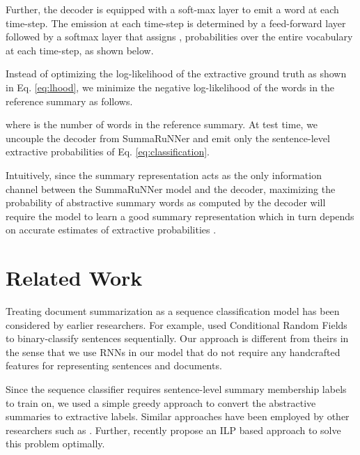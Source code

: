 \documentclass[letterpaper]{article}
\begin{document}
Further, the decoder is equipped with a soft-max layer to emit a word at each time-step. The emission at each time-step is determined by a feed-forward layer  followed by a softmax layer that assigns , probabilities over the entire vocabulary at each time-step, as shown below.

Instead of optimizing the log-likelihood of the extractive ground truth as shown in Eq. \ref{eq:lhood}, we minimize the negative log-likelihood of the words in the reference summary as follows.

where  is the number of words in the reference summary. At test time, we uncouple the decoder from SummaRuNNer and emit only the sentence-level extractive probabilities  of Eq. \ref{eq:classification}. 

Intuitively, since the summary representation  acts as the only information channel between the SummaRuNNer model and the decoder, maximizing the probability of abstractive summary words as computed by the decoder will require the model to learn a good summary representation which in turn depends on accurate estimates of extractive probabilities . 

\section{Related Work}

Treating document summarization as a sequence classification model has been considered by earlier researchers. For example, \cite{crf4summarization} used Conditional Random Fields to binary-classify sentences sequentially. Our approach is different from theirs in the sense that we use RNNs in our model that do not require any handcrafted features for representing sentences and documents. 

Since the sequence classifier requires sentence-level summary membership labels to train on, we used a simple greedy approach to convert the abstractive summaries to extractive labels. Similar approaches have been employed by other researchers such as \cite{svore}. Further, recently \cite{tgsum} propose an ILP based approach to solve this problem optimally. 
\end{document}
